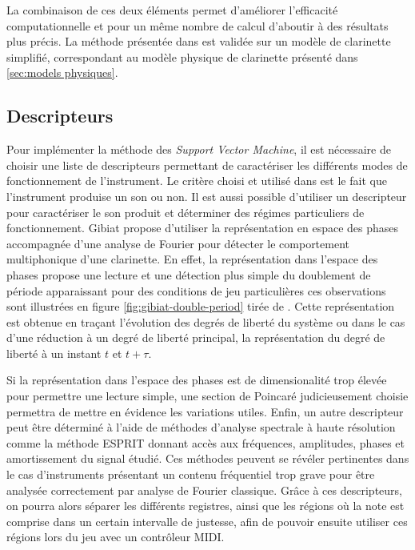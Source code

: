 \documentclass[atiam, article]{rapport} %
\begin{document}
La combinaison de ces deux éléments permet d'améliorer l'efficacité computationnelle et pour un même nombre de calcul d'aboutir à des résultats plus précis. La méthode présentée dans \cite{missoum_explicit_2014} est validée sur un modèle de clarinette simplifié, correspondant au modèle physique de clarinette présenté dans \ref{sec:models physiques}.


\subsection{Descripteurs}

Pour implémenter la méthode des \textit{Support Vector Machine}, il est nécessaire de choisir une liste de descripteurs permettant de caractériser les différents modes de fonctionnement de l'instrument. 
Le critère choisi et utilisé dans \cite{missoum_explicit_2014} est le fait que l'instrument produise un son ou non. 
Il est aussi possible d'utiliser un descripteur pour caractériser le son produit et déterminer des régimes particuliers de fonctionnement. 
Gibiat \cite{gibiat_phase_1988} propose d'utiliser la représentation en espace des phases accompagnée d'une analyse de Fourier pour détecter le comportement multiphonique d'une clarinette. 
En effet, la représentation dans l'espace des phases propose une lecture et une détection plus simple du doublement de période apparaissant pour des conditions de jeu particulières ces observations sont illustrées en figure \ref{fig:gibiat-double-period} tirée de \cite{gibiat_phase_1988}. 
Cette représentation est obtenue en traçant l'évolution des degrés de liberté du système ou dans le cas d'une réduction à un degré de liberté principal, la représentation du degré de liberté à un instant $t$ et $t + \tau$. 

Si la représentation dans l'espace des phases est de dimensionalité trop élevée pour permettre une lecture simple, une section de Poincaré judicieusement choisie permettra de mettre en évidence les variations utiles. 
Enfin, un autre descripteur peut être déterminé à l'aide de méthodes d'analyse spectrale à haute résolution comme la méthode ESPRIT \cite{ESPRIT} donnant accès aux fréquences, amplitudes, phases et amortissement du signal étudié.
Ces méthodes peuvent se révéler pertinentes dans le cas d'instruments présentant un contenu fréquentiel trop grave pour être analysée correctement par analyse de Fourier classique. Grâce à ces descripteurs, on pourra alors séparer les différents registres, ainsi que les régions où la note est comprise dans un certain intervalle de justesse, afin de pouvoir ensuite utiliser ces régions lors du jeu avec un contrôleur MIDI.
\end{document}
